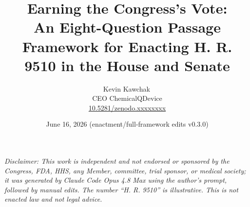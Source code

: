 \documentclass[11pt]{article}
\title{Earning the Congress's Vote:\\An Eight-Question Passage Framework for Enacting H. R. 9510 in the House and Senate}
\author{Kevin Kawchak\,\orcidicon{0009-0007-5457-8667}\\ CEO ChemicalQDevice\\ \href{https://doi.org/10.5281/zenodo.xxxxxxxx}{10.5281/zenodo.xxxxxxxx}}
\date{June 16, 2026 (enactment/full-framework edits v0.3.0)}
\begin{document}
\maketitle
\thispagestyle{empty}

\begin{abstract}

\end{abstract}

\vspace{0.2em}\noindent\footnotesize\textit{Disclaimer: This work is independent and
not endorsed or sponsored by the Congress, FDA, HHS, any Member, committee, trial
sponsor, or medical society; it was generated by Claude Code Opus 4.8 Max using the
author's prompt, followed by manual edits. The number ``H. R. 9510'' is
illustrative. This is not enacted law and not legal advice.}\normalsize\par




\tableofcontents
\vspace{0.3cm}










\clearpage


\clearpage
{}
\begingroup\raggedright\nocite{*}\endgroup


\end{document}

